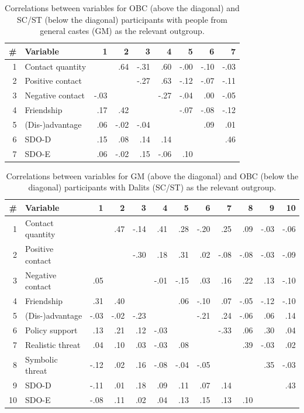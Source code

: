 \documentclass[12pt, a4paper]{article}
\begin{document}
\begin{table}[!hp]
\centering
{}
\caption{Correlations between variables for OBC (above the diagonal) and SC/ST (below the diagonal) participants with people from general castes (GM) as the relevant outgroup.}
\small	
\begin{tabular}{rlrrrrrrr} \toprule
\# & Variable & 1 & 2 & 3 & 4 & 5 & 6 & 7  \\ \midrule 
1 & Contact quantity &  &  .64 & -.31 &  .60 & -.00 & -.10 & -.03 \\ 
  2 & Positive contact &  &  & -.27 &  .63 & -.12 & -.07 & -.11 \\ 
  3 & Negative contact & -.03 &  &  & -.27 & -.04 &  .00 & -.05 \\ 
  4 & Friendship &  .17 &  .42 &  &  & -.07 & -.08 & -.12 \\ 
  5 & (Dis-)advantage &  .06 & -.02 & -.04 &  &  &  .09 &  .01 \\ 
  6 & SDO-D &  .15 &  .08 &  .14 &  .14 &  &  &  .46 \\ 
  7 & SDO-E &  .06 & -.02 &  .15 & -.06 &  .10 &  &  \\  
\bottomrule
\end{tabular}
\label{tab:c-3}
\end{table}

\newpage

\begin{table}[!hp]
\centering
{}
\caption{Correlations between variables for GM (above the diagonal) and OBC (below the diagonal) participants with Dalits (SC/ST) as the relevant outgroup.}
\small	
\begin{tabularx}{\linewidth}{r@{~~}X@{~~}rrrrrrrrrr} \toprule
\# & Variable & 1 & 2 & 3 & 4 & 5 & 6 & 7 & 8 & 9 & 10 \\ \midrule 
1 & Contact quantity &  &  .47 & -.14 &  .41 &  .28 & -.20 &  .25 &  .09 & -.03 & -.06 \\ 
  2 & Positive contact &  &  & -.30 &  .18 &  .31 &  .02 & -.08 & -.08 & -.03 & -.09 \\ 
  3 & Negative contact &  .05 &  &  & -.01 & -.15 &  .03 &  .16 &  .22 &  .13 & -.10 \\ 
  4 & Friendship &  .31 &  .40 &  &  &  .06 & -.10 &  .07 & -.05 & -.12 & -.10 \\ 
  5 & (Dis-)advantage & -.03 & -.02 & -.23 &  &  & -.21 &  .24 & -.06 &  .06 &  .14 \\ 
  6 & Policy support &  .13 &  .21 &  .12 & -.03 &  &  & -.33 &  .06 &  .30 &  .04 \\ 
  7 & Realistic threat &  .04 &  .10 &  .03 & -.03 &  .08 &  &  &  .39 & -.03 &  .02 \\ 
  8 & Symbolic threat & -.12 &  .02 &  .16 & -.08 & -.04 & -.05 &  &  &  .35 & -.03 \\ 
  9 & SDO-D & -.11 &  .01 &  .18 &  .09 &  .11 &  .07 &  .14 &  &  &  .43 \\ 
  10 & SDO-E & -.08 &  .11 &  .02 &  .04 &  .13 &  .15 &  .13 &  .10 &  &  \\ 
\bottomrule
\end{tabularx}
\label{tab:c-4}
\end{table}
\end{document}
